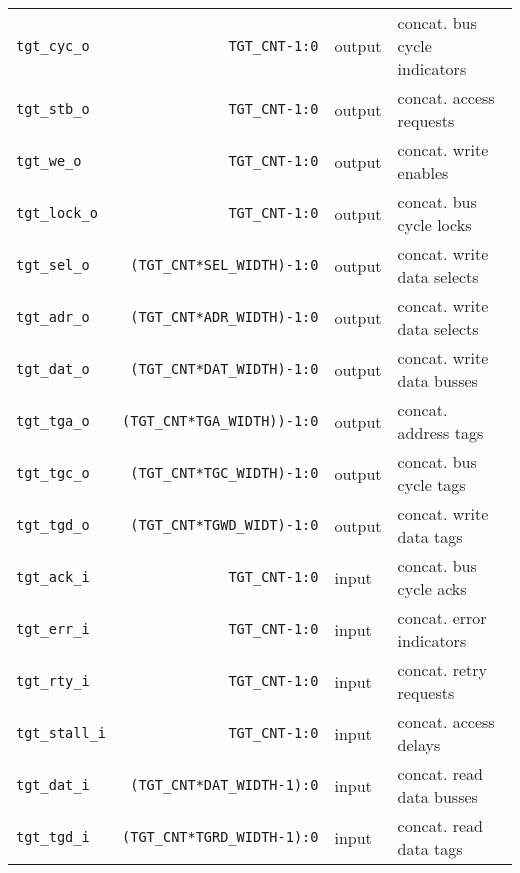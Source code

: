 \begin{center}
\begin{longtable}{|l|r|l|l|}
    \texttt{tgt\_cyc\_o}         & \texttt{TGT\_CNT-1:0}               & output & concat. bus cycle indicators   \\
    \texttt{tgt\_stb\_o}         & \texttt{TGT\_CNT-1:0}               & output & concat. access requests	 \\
    \texttt{tgt\_we\_o}          & \texttt{TGT\_CNT-1:0}               & output & concat. write enables	         \\
    \texttt{tgt\_lock\_o}        & \texttt{TGT\_CNT-1:0}               & output & concat. bus cycle locks	 \\
    \texttt{tgt\_sel\_o}         & \texttt{(TGT\_CNT*SEL\_WIDTH)-1:0}  & output & concat. write data selects     \\
    \texttt{tgt\_adr\_o}         & \texttt{(TGT\_CNT*ADR\_WIDTH)-1:0}  & output & concat. write data selects     \\
    \texttt{tgt\_dat\_o}         & \texttt{(TGT\_CNT*DAT\_WIDTH)-1:0}  & output & concat. write data busses      \\
    \texttt{tgt\_tga\_o}         & \texttt{(TGT\_CNT*TGA\_WIDTH))-1:0} & output & concat. address tags	         \\
    \texttt{tgt\_tgc\_o}         & \texttt{(TGT\_CNT*TGC\_WIDTH)-1:0}  & output & concat. bus cycle tags	 \\
    \texttt{tgt\_tgd\_o}         & \texttt{(TGT\_CNT*TGWD\_WIDT)-1:0}  & output & concat. write data tags	 \\
    \texttt{tgt\_ack\_i}         & \texttt{TGT\_CNT-1:0}               & input  & concat. bus cycle acks         \\
    \texttt{tgt\_err\_i}         & \texttt{TGT\_CNT-1:0}               & input  & concat. error indicators	 \\
    \texttt{tgt\_rty\_i}         & \texttt{TGT\_CNT-1:0}               & input  & concat. retry requests	 \\
    \texttt{tgt\_stall\_i}       & \texttt{TGT\_CNT-1:0}               & input  & concat. access delays	         \\
    \texttt{tgt\_dat\_i}         & \texttt{(TGT\_CNT*DAT\_WIDTH-1):0}  & input  & concat. read data busses	 \\
    \texttt{tgt\_tgd\_i}         & \texttt{(TGT\_CNT*TGRD\_WIDTH-1):0} & input  & concat. read data tags         \\   
  \end{longtable}
\end{center}  
\endgroup

